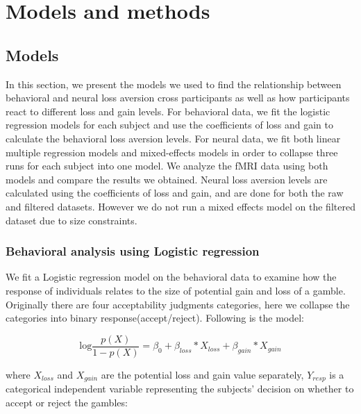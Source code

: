\documentclass[11pt]{article}
\begin{document}
\section{Models and methods}

\subsection{Models}

In this section, we present the models we used to find the relationship between behavioral and neural loss aversion cross participants as well as how participants react to different loss and gain levels. For behavioral data, we fit the logistic regression models for each subject and use the coefficients of loss and gain to calculate the behavioral loss aversion levels. For neural data, we fit both linear multiple regression models and mixed-effects models in order to collapse three runs for each subject into one model. We analyze the fMRI data using both models and compare the results we obtained. Neural loss aversion levels are calculated using the coefficients of loss and gain, and are done for both the raw and filtered datasets. However we do not run a mixed effects model on the filtered dataset due to size constraints.   

\subsubsection{Behavioral analysis using Logistic regression}

We fit a Logistic regression model on the behavioral data to examine how the response of individuals relates to the size of potential gain and loss of a gamble. Originally there are four acceptability judgments categories, here we collapse the categories into binary response(accept/reject). Following is the model:

\begin{equation}
\textrm{log}\frac{p(X)}{1-p(X)} = \beta_0 + \beta_{loss} *X_{loss} + \beta_{gain} * X_{gain}
\end{equation}

where $X_{loss}$ and $X_{gain}$ are the potential loss and gain value separately, $Y_{resp}$ is a categorical independent variable representing the subjects' decision on whether to accept or reject the gambles:
\end{document}
